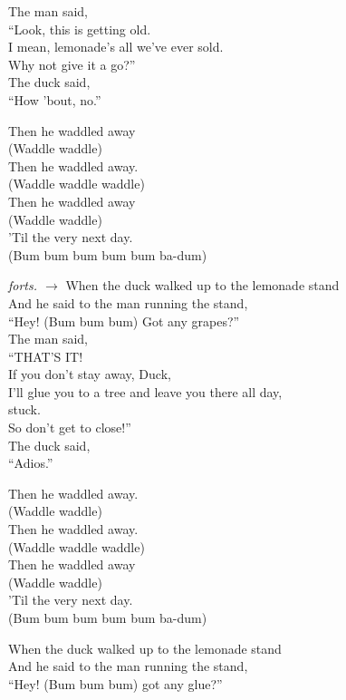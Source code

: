The man said,\\
``Look, this is getting old.\\
I mean, lemonade's all we've ever sold.\\
Why not give it a go?''\\
The duck said,\\
``How 'bout, no.''\par
\vspace{10pt}
Then he waddled away\\
(Waddle waddle)\\
Then he waddled away.\\
(Waddle waddle waddle)\\
Then he waddled away\\
(Waddle waddle)\\
'Til the very next day.\\
(Bum bum bum bum bum ba-dum)\par
\vfill
\hfill {\footnotesize\textit{forts. $\rightarrow$}}
\newpage
When the duck walked up to the lemonade stand\\
And he said to the man running the stand,\\
``Hey! (Bum bum bum) Got any grapes?''\\
The man said,\\
``THAT’S IT!\\
If you don't stay away, Duck,\\
I'll glue you to a tree and leave you there all day,\\
stuck.\\
So don't get to close!''\\
The duck said,\\
``Adios.''\par
\vspace{10pt}
Then he waddled away.\\
(Waddle waddle)\\
Then he waddled away.\\
(Waddle waddle waddle)\\
Then he waddled away\\
(Waddle waddle)\\
'Til the very next day.\\
(Bum bum bum bum bum ba-dum)\par
\vspace{10pt}
When the duck walked up to the lemonade stand\\
And he said to the man running the stand,\\
``Hey! (Bum bum bum) got any glue?''\\
